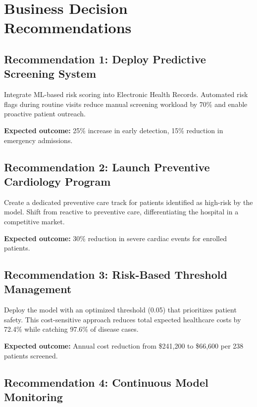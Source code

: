 \documentclass[12pt,a4paper]{article}
\begin{document}
\section{Business Decision Recommendations}

\subsection{Recommendation 1: Deploy Predictive Screening System}

Integrate ML-based risk scoring into Electronic Health Records. Automated risk flags during routine visits reduce manual screening workload by 70\% and enable proactive patient outreach.

\textbf{Expected outcome:} 25\% increase in early detection, 15\% reduction in emergency admissions.

\subsection{Recommendation 2: Launch Preventive Cardiology Program}

Create a dedicated preventive care track for patients identified as high-risk by the model. Shift from reactive to preventive care, differentiating the hospital in a competitive market.

\textbf{Expected outcome:} 30\% reduction in severe cardiac events for enrolled patients.

\subsection{Recommendation 3: Risk-Based Threshold Management}

Deploy the model with an optimized threshold (0.05) that prioritizes patient safety. This cost-sensitive approach reduces total expected healthcare costs by 72.4\% while catching 97.6\% of disease cases.

\textbf{Expected outcome:} Annual cost reduction from \$241,200 to \$66,600 per 238 patients screened.

\subsection{Recommendation 4: Continuous Model Monitoring}
\end{document}
